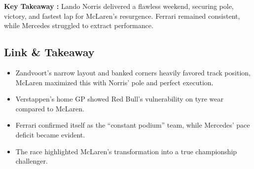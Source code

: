 \textbf{Key Takeaway :} Lando Norris delivered a flawless weekend, securing pole, victory, and fastest lap for McLaren’s resurgence. Ferrari remained consistent, while Mercedes struggled to extract performance.

\subsection{Link \& Takeaway}

\begin{itemize}
    \item Zandvoort’s narrow layout and banked corners heavily favored track position, McLaren maximized this with Norris’ pole and perfect execution. 
    \item Verstappen’s home GP showed Red Bull’s vulnerability on tyre wear compared to McLaren. 
    \item Ferrari confirmed itself as the “constant podium” team, while Mercedes’ pace deficit became evident. 
    \item The race highlighted McLaren’s transformation into a true championship challenger.
\end{itemize}
